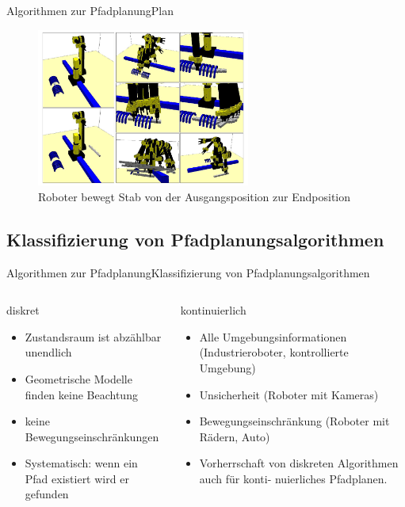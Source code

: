 \documentclass[t,aspectratio=169,dvipsnames]{beamer}
\begin{document}
\begin{frame}{Algorithmen zur Pfadplanung}{Plan}
	\begin{figure}
		\includegraphics[width=7cm]{images/hierarchical.png}
		\caption{Roboter bewegt Stab von der Ausgangsposition zur Endposition} 
	\end{figure}
\end{frame}

\subsection{Klassifizierung von Pfadplanungsalgorithmen}

\begin{frame}{Algorithmen zur Pfadplanung}{Klassifizierung von Pfadplanungsalgorithmen}
	\begin{columns}
		\begin{column}[T]{0.5\textwidth}
			\begin{center} diskret \end{center}
			\begin{itemize}[<1->]
			\item Zustandsraum ist abzählbar unendlich 
			\item Geometrische Modelle finden keine Beachtung
			\item keine Bewegungseinschränkungen
			\item Systematisch: wenn ein Pfad existiert wird er gefunden
			\end{itemize}
		\end{column}
		\begin{column}[T]{0.5\textwidth}
			\begin{center} kontinuierlich \end{center}
				\begin{itemize}[<2>]
			\item Alle Umgebungsinformationen (Industrieroboter, kontrollierte Umgebung)
			\item Unsicherheit (Roboter mit Kameras)
			\item Bewegungseinschränkung (Roboter mit Rädern, Auto)
			\item Vorherrschaft von diskreten Algorithmen auch für konti- nuierliches Pfadplanen. 
		\end{itemize}
		\end{column}
	\end{columns}
\end{frame}
\end{document}

